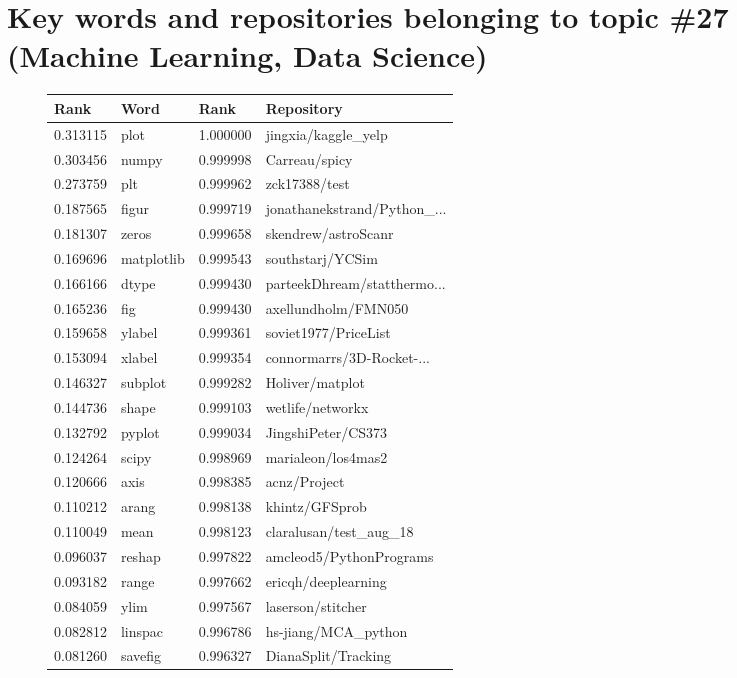 \documentclass[conference,10pt]{IEEEtran}
\begin{document}
\section{Key words and repositories belonging to topic \#27 (Machine Learning, Data Science)} \label{ml}
\begin{figure}[H]
\centering \small
\begin{tabularx}{0.5\textwidth}{| l | l || l | X |}
\hline
\textbf{Rank} & \textbf{Word} & \textbf{Rank} & \textbf{Repository} \\
\hline
0.313115 & plot & 1.000000 & jingxia/kaggle\_yelp \\
0.303456 & numpy & 0.999998 & Carreau/spicy \\
0.273759 & plt & 0.999962 & zck17388/test \\
0.187565 & figur & 0.999719 & jonathanekstrand/Python\_... \\
0.181307 & zeros & 0.999658 & skendrew/astroScanr \\
0.169696 & matplotlib & 0.999543 & southstarj/YCSim \\
0.166166 & dtype & 0.999430 & parteekDhream/statthermo... \\
0.165236 & fig & 0.999430 & axellundholm/FMN050 \\
0.159658 & ylabel & 0.999361 & soviet1977/PriceList \\
0.153094 & xlabel & 0.999354 & connormarrs/3D-Rocket-... \\
0.146327 & subplot & 0.999282 & Holiver/matplot \\
0.144736 & shape & 0.999103 & wetlife/networkx \\
0.132792 & pyplot & 0.999034 & JingshiPeter/CS373 \\
0.124264 & scipy & 0.998969 & marialeon/los4mas2 \\
0.120666 & axis & 0.998385 & acnz/Project \\
0.110212 & arang & 0.998138 & khintz/GFSprob \\
0.110049 & mean & 0.998123 & claralusan/test\_aug\_18 \\
0.096037 & reshap & 0.997822 & amcleod5/PythonPrograms \\
0.093182 & range & 0.997662 & ericqh/deeplearning \\
0.084059 & ylim & 0.997567 & laserson/stitcher \\
0.082812 & linspac & 0.996786 & hs-jiang/MCA\_python \\
0.081260 & savefig & 0.996327 & DianaSplit/Tracking \\

\end{tabularx}
\end{figure}
\end{document}
